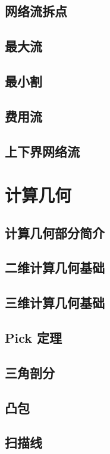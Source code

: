   \section{网络流拆点}
  
  \section{最大流}
  
  \section{最小割}
  
  \section{费用流}
  
  \section{上下界网络流}
  
\chapter{计算几何}
\section{计算几何部分简介}

\section{二维计算几何基础}

\section{三维计算几何基础}

\section{Pick 定理}

\section{三角剖分}

\section{凸包}

\section{扫描线}

